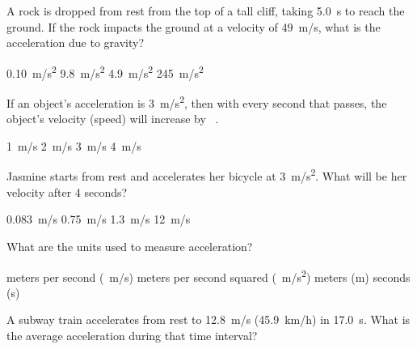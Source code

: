 \documentclass{exam}
\begin{document}
\begin{center}
\end{center}
\begin{questions}



\question
A rock is dropped from rest from the top of a tall cliff, taking \SI{5.0}{s} to reach the ground. If the rock impacts the ground at a velocity of \SI{49}{m/s}, what is the acceleration due to gravity?

\begin{choices}
    \choice \SI{0.10}{m/s^2}
    \correctchoice \SI{9.8}{m/s^2}
    \choice \SI{4.9}{m/s^2}
    \choice \SI{245}{m/s^2}
\end{choices}

\question
If an object's acceleration is \SI{3}{m/s^2}, then with every second that passes, the object's velocity (speed) will increase by \fillin[][2cm]\ .

\begin{choices}
    \choice \SI{1}{m/s}
    \choice \SI{2}{m/s}
    \correctchoice \SI{3}{m/s}
    \choice \SI{4}{m/s}
\end{choices}

\question
Jasmine starts from rest and accelerates her bicycle at \SI{3}{m/s^2}. What will be her velocity after 4 seconds?

\begin{choices}
    \choice \SI{0.083}{m/s}
    \choice \SI{0.75}{m/s}
    \choice \SI{1.3}{m/s}
    \correctchoice \SI{12}{m/s}
\end{choices}

\question
What are the units used to measure acceleration?

\begin{choices}
    \choice meters per second (\SI{}{m/s})
    \correctchoice meters per second squared (\SI{}{m/s^2})
    \choice meters (m)
    \choice seconds (s)
\end{choices}

\clearpage
\question %
A subway train accelerates from rest to \SI{12.8}{m/s} (\SI{45.9}{km/h}) in \SI{17.0}{s}. What is the average acceleration during that time interval?


\end{questions}
\end{document}
